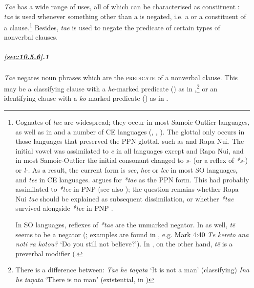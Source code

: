 \textit{Ta{\ꞌ}e} has a wide range of uses, all of which can be characterised as constituent : \textit{ta{\ꞌ}e} is used whenever something other than a  is negated, i.e. a  or a constituent of a clause.\footnote{\label{fn:500}Cognates of \textit{ta{\ꞌ}e} are widespread; they occur in most Samoic-Outlier languages, as well as in  and a number of CE languages (, , ). The glottal only occurs in those languages that preserved the PPN glottal, such as  and Rapa Nui. The initial vowel was assimilated to \textit{e} in all languages except  and Rapa Nui, and in most Samoic-Outlier the initial consonant changed to \textit{s-} (or a reflex of \textit{*s-}) or \textit{l-}. As a result, the current form is \textit{see}, \textit{hee} or \textit{lee} in most SO languages, and \textit{tee} in CE languages. \citet[85–87]{Clark1976} argues for \textit{*ta{\ꞌ}e} as the PPN form. This had probably assimilated to \textit{*te{\ꞌ}e} in PNP (see also \citealt{Hamp1977}); the question remains whether Rapa Nui \textit{ta{\ꞌ}e} should be explained as subsequent dissimilation, or whether \textit{*ta{\ꞌ}e} survived alongside \textit{*te{\ꞌ}e} in PNP \citep[87]{Clark1976}.

In SO languages, reflexes of \textit{*ta{\ꞌ}e} are the unmarked negator. In  as well, \textit{tē} seems to be a  negator (\citealt[78]{Janeau1908}; examples are found in \citet{Pupu-takao1908}, e.g. Mark 4:40 \textit{Tē kereto ana noti ra kotou?} ‘Do you still not believe?’). In , on the other hand, \textit{tē} is a preverbal modifier (\citealt[52]{MutuTeìkitutoua2002}.} Besides, \textit{ta{\ꞌ}e} is used to negate the predicate of certain types of nonverbal clauses.

\subparagraph{\ref{sec:10.5.6}.1} \textit{Ta{\ꞌ}e} negates noun phrases which are the \textsc{predicate} of a nonverbal clause. This may be a classifying clause with a \textit{he}{}-marked predicate () as in ,\footnote{\label{fn:501}There is a difference between:
\ea
\textit{Ta{\ꞌ}e he taŋata} \textup{‘It is not a man’ (classifying)}
\z
\ea
\textit{{\ꞌ}Ina he taŋata} \textup{‘There is no man’ (existential,  in )}\z} or an identifying clause with a \textit{ko}{}-marked predicate () as in .

